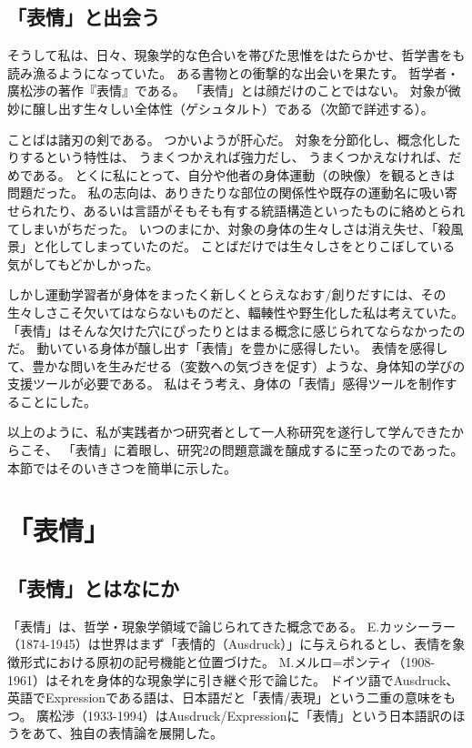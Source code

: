 \subsection{「表情」と出会う}
\label{subsec:encount_hyojo}
そうして私は、日々、現象学的な色合いを帯びた思惟をはたらかせ、哲学書をも読み漁るようになっていた。
ある書物との衝撃的な出会いを果たす。
哲学者・廣松渉の著作『表情』\cite{hiromatsu:1989}である。
「表情」とは顔だけのことではない。
対象が微妙に醸し出す生々しい全体性（ゲシュタルト）である（次節で詳述する）。

ことばは諸刃の剣である。
つかいようが肝心だ。
対象を分節化し、概念化したりするという特性は、
うまくつかえれば強力だし、
うまくつかえなければ、だめである。
とくに私にとって、自分や他者の身体運動（の映像）を観るときは問題だった。
私の志向は、ありきたりな部位の関係性や既存の運動名に吸い寄せられたり、あるいは言語がそもそも有する統語構造といったものに絡めとられてしまいがちだった。
いつのまにか、対象の身体の生々しさは消え失せ、「殺風景」と化してしまっていたのだ。
ことばだけでは生々しさをとりこぼしている気がしてもどかしかった。

しかし運動学習者が身体をまったく新しくとらえなおす/創りだすには、その生々しさこそ欠いてはならないものだと、輻輳性や野生化した私は考えていた。
「表情」はそんな欠けた穴にぴったりとはまる概念に感じられてならなかったのだ。
動いている身体が醸し出す「表情」を豊かに感得したい。
表情を感得して、豊かな問いを生みだせる（変数への気づきを促す）ような、身体知の学びの支援ツールが必要である。
私はそう考え、身体の「表情」感得ツールを制作することにした。


以上のように、私が実践者かつ研究者として一人称研究を遂行して学んできたからこそ、
「表情」に着眼し、研究2の問題意識を醸成するに至ったのであった。
本節ではそのいきさつを簡単に示した。

\section{「表情」}
\label{sec:hyojo}
\subsection{「表情」とはなにか}
\label{subsec:whatishyojo}
「表情」は、哲学・現象学領域で論じられてきた概念である。
E.カッシーラー\cite{cassirer:1929}（1874-1945）は世界はまず「表情的（Ausdruck）」に与えられるとし、表情を象徴形式における原初の記号機能と位置づけた。
M.メルロ=ポンティ\cite{merleau-ponty:1945}（1908-1961）はそれを身体的な現象学に引き継ぐ形で論じた。
ドイツ語でAusdruck、英語でExpressionである語は、日本語だと「表情/表現」という二重の意味をもつ。
廣松渉（1933-1994）はAusdruck/Expressionに「表情」という日本語訳のほうをあて、独自の表情論を展開した。


